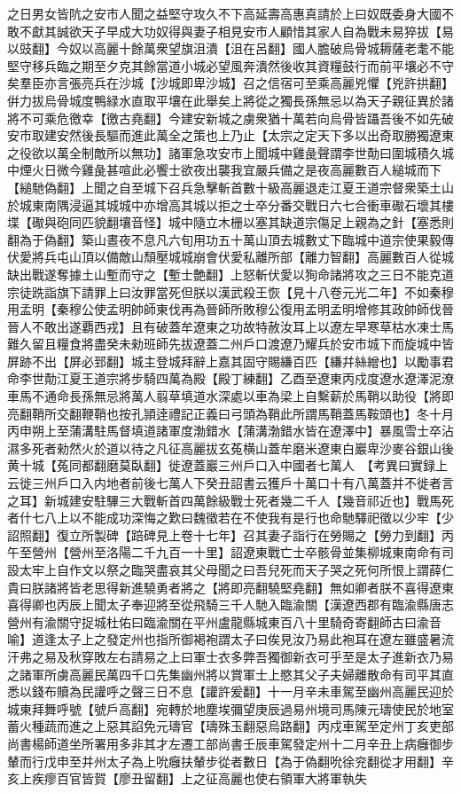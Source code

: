 之日男女皆阬之安市人聞之益堅守攻久不下高延壽高惠真請於上曰奴既委身大國不敢不獻其誠欲天子早成大功奴得與妻子相見安市人顧惜其家人自為戰未易猝拔【易以豉翻】今奴以高麗十餘萬衆望旗沮潰【沮在呂翻】國人膽破烏骨城耨薩老耄不能堅守移兵臨之期至夕克其餘當道小城必望風奔潰然後收其資糧鼓行而前平壤必不守矣羣臣亦言張亮兵在沙城【沙城即卑沙城】召之信宿可至乘高麗兇懼【兇許拱翻】倂力拔烏骨城度鴨緑水直取平壤在此舉矣上將從之獨長孫無忌以為天子親征異於諸將不可乘危徼幸【徼古堯翻】今建安新城之虜衆猶十萬若向烏骨皆躡吾後不如先破安市取建安然後長驅而進此萬全之策也上乃止【太宗之定天下多以出奇取勝獨遼東之役欲以萬全制敵所以無功】諸軍急攻安市上聞城中雞彘聲謂李世勣曰圍城積久城中煙火日微今雞彘甚喧此必饗士欲夜出襲我宜嚴兵備之是夜高麗數百人縋城而下【縋馳偽翻】上聞之自至城下召兵急擊斬首數十級高麗退走江夏王道宗督衆築土山於城東南隅浸逼其城城中亦增高其城以拒之士卒分番交戰日六七合衝車礮石壞其樓堞【礮與砲同匹貌翻壤音怪】城中隨立木栅以塞其缺道宗傷足上親為之針【塞悉則翻為于偽翻】築山晝夜不息凡六旬用功五十萬山頂去城數丈下臨城中道宗使果毅傳伏愛將兵屯山頂以備敵山頹壓城城崩會伏愛私離所部【離力智翻】高麗數百人從城缺出戰遂奪據土山塹而守之【塹士艶翻】上怒斬伏愛以狥命諸將攻之三日不能克道宗徒跣詣旗下請罪上曰汝罪當死但朕以漢武殺王恢【見十八卷元光二年】不如秦穆用孟明【秦穆公使孟明帥師東伐再為晉師所敗穆公復用孟明孟明增修其政帥師伐晉晉人不敢出遂覇西戎】且有破蓋牟遼東之功故特赦汝耳上以遼左早寒草枯水凍士馬難久留且糧食將盡癸未勑班師先拔遼蓋二州戶口渡遼乃耀兵於安市城下而旋城中皆屏跡不出【屏必郅翻】城主登城拜辭上嘉其固守賜縑百匹【縑幷絲繒也】以勵事君命李世勣江夏王道宗將步騎四萬為殿【殿丁練翻】乙酉至遼東丙戍度遼水遼澤泥潦車馬不通命長孫無忌將萬人翦草填道水深處以車為梁上自繫薪於馬鞘以助役【將即亮翻鞘所交翻鞭鞘也按孔頴逹禮記正義曰弓頭為鞘此所謂馬鞘蓋馬鞍頭也】冬十月丙申朔上至蒲溝駐馬督填道諸軍度渤錯水【蒲溝渤錯水皆在遼澤中】暴風雪士卒沾濕多死者勑然火於道以待之凡征高麗拔玄菟横山蓋牟磨米遼東白巖卑沙麥谷銀山後黄十城【菟同都翻磨莫臥翻】徙遼蓋巖三州戶口入中國者七萬人　【考異曰實録上云徙三州戶口入内地者前後七萬人下癸丑詔書云獲戶十萬口十有八萬蓋并不徙者言之耳】新城建安駐驆三大戰斬首四萬餘級戰士死者幾二千人【幾音祁近也】戰馬死者什七八上以不能成功深悔之歎曰魏徵若在不使我有是行也命馳驛祀徵以少牢【少詔照翻】復立所製碑【踣碑見上卷十七年】召其妻子詣行在勞賜之【勞力到翻】丙午至營州【營州至洛陽二千九百一十里】詔遼東戰亡士卒骸骨並集柳城東南命有司設太牢上自作文以祭之臨哭盡哀其父母聞之曰吾兒死而天子哭之死何所恨上謂薛仁貴曰朕諸將皆老思得新進驍勇者將之【將即亮翻驍堅堯翻】無如卿者朕不喜得遼東喜得卿也丙辰上聞太子奉迎將至從飛騎三千人馳入臨渝關【漢遼西郡有臨渝縣唐志營州有渝關守捉城杜佑曰臨渝關在平州盧龍縣城東百八十里騎奇寄翻師古曰渝音喻】道逢太子上之發定州也指所御褐袍謂太子曰俟見汝乃易此袍耳在遼左雖盛暑流汗弗之易及秋穿敗左右請易之上曰軍士衣多弊吾獨御新衣可乎至是太子進新衣乃易之諸軍所虜高麗民萬四千口先集幽州將以賞軍士上愍其父子夫婦離散命有司平其直悉以錢布贖為民讙呼之聲三日不息【讙許爰翻】十一月辛未車駕至幽州高麗民迎於城東拜舞呼號【號戶高翻】宛轉於地塵埃彌望庚辰過易州境司馬陳元璹使民於地室蓄火種蔬而進之上惡其諂免元璹官【璹殊玉翻惡烏路翻】丙戍車駕至定州丁亥吏部尚書楊師道坐所署用多非其才左遷工部尚書壬辰車駕發定州十二月辛丑上病癰御步輦而行戊申至并州太子為上吮癰扶輦步從者數日【為于偽翻吮徐兖翻從才用翻】辛亥上疾瘳百官皆賀【廖丑留翻】上之征高麗也使右領軍大將軍執失